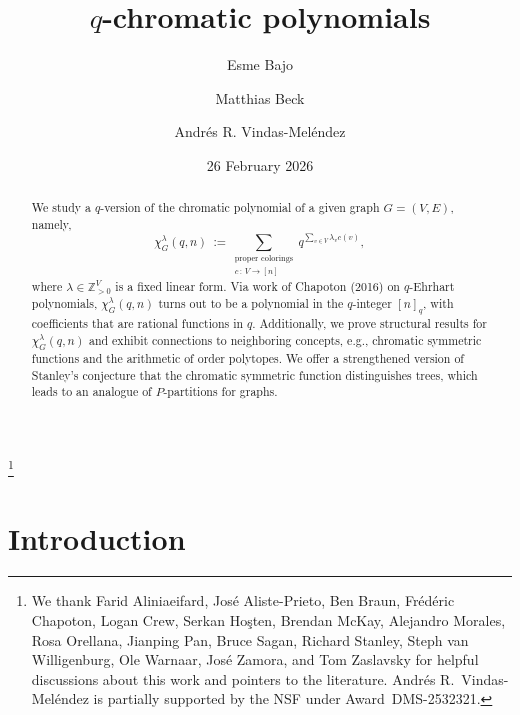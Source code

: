 \documentclass[11pt]{amsart}
\newcommand\ZZ{\mathbb{Z}}
\begin{document}
\title{$q$-chromatic polynomials}

\author{Esme Bajo}
\address{Department of Mathematics, San Diego Miramar College}

\author{Matthias Beck}
\address{Department of Mathematics, San Francisco State University}

\author{Andr\'{e}s R. Vindas-Mel\'{e}ndez}
\address{Department of Mathematics\\
         Harvey Mudd College}


\begin{abstract}
We study a $q$-version of the chromatic polynomial of a given graph $G=(V,E)$, namely,
\[
\chi_G^\lambda(q,n) \ := \sum_{\substack{\text{proper colorings}\\ c\,:\,V\to[n]}} q^{ \sum_{ v \in V } \lambda_v c(v) },
\]
where $\lambda \in \ZZ_{>0}^V$ is a fixed linear form.
Via work of Chapoton (2016) on $q$-Ehrhart polynomials, $\chi_G^\lambda(q,n)$ turns out to be a polynomial in the $q$-integer $[n]_q$, with coefficients that are rational functions in $q$. 
Additionally, we prove structural results for $\chi_G^\lambda(q,n)$ and exhibit connections to neighboring concepts, e.g., chromatic symmetric functions and the arithmetic of order polytopes. 
We offer a strengthened version of Stanley's conjecture that the chromatic symmetric function distinguishes trees, which leads to an analogue of $P$-partitions for graphs. 
\end{abstract}

\date{26 February 2026}
\thanks{We thank Farid Aliniaeifard, Jos\'e Aliste-Prieto, Ben Braun, Fr\'ed\'eric Chapoton, Logan Crew, Serkan Ho\c sten, Brendan McKay, Alejandro Morales, Rosa Orellana, Jianping Pan, Bruce Sagan,
Richard Stanley, Steph van Willigenburg, Ole Warnaar, Jos\'e Zamora, and Tom Zaslavsky for helpful discussions about this work and pointers to the literature.
Andr\'es R.~Vindas-Mel\'endez is partially supported by the NSF under Award~DMS-2532321.  }
\maketitle


\section{Introduction}
\end{document}
